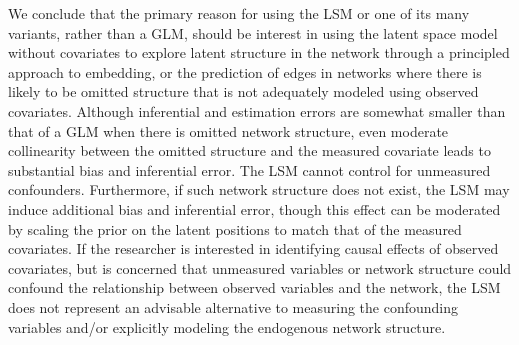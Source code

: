 \documentclass[11pt]{article}
\begin{document}
We conclude that the primary reason for using the LSM or one of its many variants, rather than a GLM, should be interest in using the latent space model without covariates to explore latent structure in the network through a principled approach to embedding, or the prediction of edges in networks where there is likely to be omitted structure that is not adequately modeled using observed covariates. Although inferential and estimation errors are somewhat smaller than that of a GLM when there is omitted network structure, even moderate collinearity between the omitted structure and the measured covariate leads to substantial bias and inferential error. The LSM cannot control for unmeasured confounders. Furthermore, if such network structure does not exist, the LSM may induce additional bias and inferential error, though this effect can be moderated by scaling the prior on the latent positions to match that of the measured covariates. If the researcher is interested in identifying causal effects of observed covariates, but is concerned that unmeasured variables or network structure could confound the relationship between observed variables and the network, the LSM does not represent an advisable alternative to measuring the confounding variables and/or explicitly modeling the endogenous network structure.

\newpage



\end{document}
